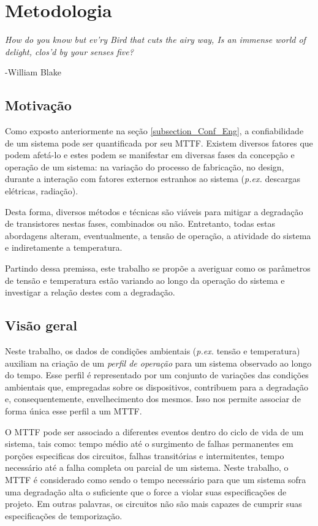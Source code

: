 \chapter{Metodologia}
\epigraph{\textit{How do you know but ev’ry Bird that cuts the airy way, Is an immense world of delight, clos’d by your senses five?}}{-William Blake}
\section{Motivação}
Como exposto anteriormente na seção \ref{subsection_Conf_Eng}, a confiabilidade de um sistema pode ser quantificada por seu MTTF. Existem diversos fatores que podem afetá-lo e estes podem se manifestar em diversas fases da concepção e operação de um sistema: na variação do processo de fabricação, no design, durante a interação com fatores externos estranhos ao sistema (\textit{p.ex.} descargas elétricas, radiação).

Desta forma, diversos métodos e técnicas são viáveis para mitigar a degradação de transistores nestas fases, combinados ou não. Entretanto, todas estas abordagens alteram, eventualmente, a tensão de operação, a atividade do sistema e indiretamente a temperatura.

Partindo dessa premissa, este trabalho se propõe a averiguar como os parâmetros de tensão e temperatura estão variando ao longo da operação do sistema e investigar a relação destes com a degradação.

\section{Visão geral}
\label{section_visao_geral}
Neste trabalho, os dados de condições ambientais (\textit{p.ex.} tensão e temperatura) auxiliam na criação de um \textit{perfil de operação} para um sistema observado ao longo do tempo. Esse perfil é representado por um conjunto de variações das condições ambientais que, empregadas sobre os dispositivos, contribuem para a degradação e, consequentemente, envelhecimento dos mesmos. Isso nos permite associar de forma única esse perfil a um MTTF.

O MTTF pode ser associado a diferentes eventos dentro do ciclo de vida de um sistema, tais como: tempo médio até o surgimento de falhas permanentes em porções especificas dos circuitos, falhas transitórias e intermitentes, tempo necessário até a falha completa ou parcial de um sistema. Neste trabalho, o MTTF é considerado como sendo o tempo necessário para que um sistema sofra uma degradação alta o suficiente que o force a violar suas especificações de projeto. Em outras palavras, os circuitos não são mais capazes de cumprir suas especificações de temporização.

